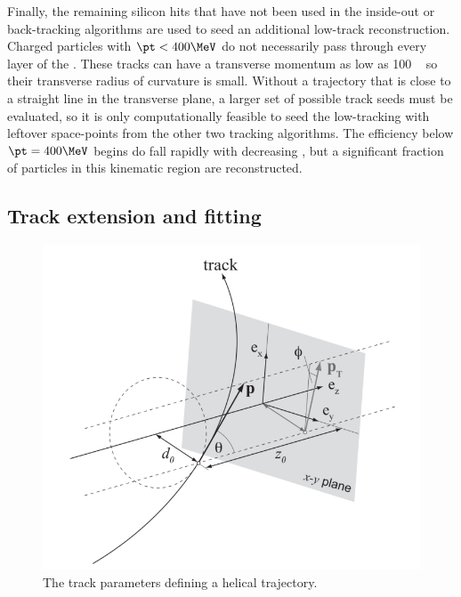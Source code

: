 Finally, the remaining silicon hits that have not been used in the inside-out or back-tracking algorithms are used to seed an additional low-\pt track reconstruction.%
Charged particles with $\pt < 400 \MeV$ do not necessarily pass through every layer of the \sct.
These tracks can have a transverse momentum as low as 100 \MeV~ so their transverse radius of curvature is small.
Without a trajectory that is close to a straight line in the transverse plane, a larger set of possible track seeds must be evaluated, so it is only computationally feasible to seed the low-\pt tracking with leftover space-points from the other two tracking algorithms.
The efficiency below $\pt = 400 \MeV$ begins do fall rapidly with decreasing \pt, but a significant fraction of particles in this kinematic region are reconstructed.

\subsection{Track extension and fitting}

\begin{figure}[t]
  \includegraphics{track_schematic.png}
  \caption{The track parameters defining a helical trajectory.}
  \label{fig:trk_params}
\end{figure}

